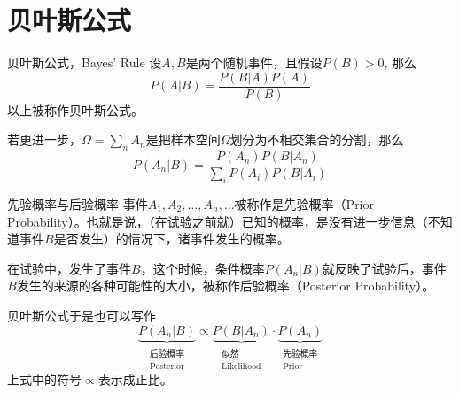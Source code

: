 
\section{贝叶斯公式}


\begin{frame}

\begin{block}{贝叶斯公式，Bayes' Rule}
设$A,B$是两个随机事件，且假设$P(B) > 0$, 那么
\[P(A|B) = \dfrac{P(B|A)P(A)}{P(B)}\]
以上被称作贝叶斯公式。

\vspace{1em}
\pause

若更进一步，$\Omega = \sum\limits_n A_n$是把样本空间$\Omega$划分为不相交集合的分割，那么
\[P(A_n|B) = \dfrac{P(A_n)P(B|A_n)}{\sum\limits_i P(A_i)P(B|A_i)}\]
\end{block}

\end{frame}


\begin{frame}

\begin{block}{先验概率与后验概率}
事件$A_1,A_2,\ldots,A_n,\ldots$被称作是先验概率（Prior Probability）。也就是说，（在试验之前就）已知的概率，是没有进一步信息（不知道事件$B$是否发生）的情况下，诸事件发生的概率。

\vspace{1em}

在试验中，发生了事件$B$，这个时候，条件概率$P(A_n|B)$就反映了试验后，事件$B$发生的来源的各种可能性的大小，被称作后验概率（Posterior Probability）。
\end{block}

\vspace{1em}
\pause

贝叶斯公式于是也可以写作
\[\underbrace{P(A_n|B)}_{\substack{\text{后验概率} \\ \text{Posterior}}} \propto \underbrace{P(B|A_n)}_{\substack{\text{似然} \\ \text{Likelihood}}} \cdot \underbrace{P(A_n)}_{\substack{\text{先验概率} \\ \text{Prior}}}\]
上式中的符号$\propto$表示成正比。

\end{frame}

